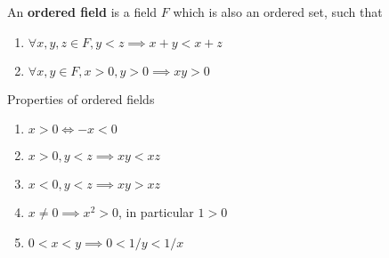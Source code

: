     \begin{defi}
        An \textbf{ordered field} is a field $F$ which is also an ordered set, such that
        \begin{enumerate}
            \item $\forall x,y,z \in F, y<z \implies x+y < x+z$
            \item $\forall x,y \in F, x>0, y>0 \implies xy > 0$
        \end{enumerate}
    \end{defi}

    \begin{prop} Properties of ordered fields
        \begin{enumerate}
            \item $x > 0 \Longleftrightarrow -x < 0$
            \item $x > 0, y < z \implies xy < xz$
            \item $x < 0, y < z \implies xy > xz$
            \item $x \neq 0 \implies x^2 > 0$, in particular $1 > 0$
            \item $0 < x < y \implies 0 < 1/y < 1/x$
        \end{enumerate}
    \end{prop}

